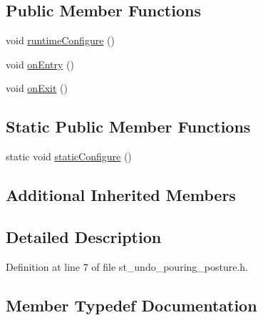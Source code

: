 \subsection*{Public Member Functions}
\begin{DoxyCompactItemize}
\item 
void \hyperlink{structsm__moveit__wine__serve_1_1StPouringUndoPosture_a43aae1e38ab92eab3f942279bf08890d}{runtime\+Configure} ()
\item 
void \hyperlink{structsm__moveit__wine__serve_1_1StPouringUndoPosture_aefad9969ee8ec5b1687faaab2b6127f8}{on\+Entry} ()
\item 
void \hyperlink{structsm__moveit__wine__serve_1_1StPouringUndoPosture_ad6034eaf66a0c5d236911bf16038dcef}{on\+Exit} ()
\end{DoxyCompactItemize}
\subsection*{Static Public Member Functions}
\begin{DoxyCompactItemize}
\item 
static void \hyperlink{structsm__moveit__wine__serve_1_1StPouringUndoPosture_a3be8e120fb67fa0108ee1741bb2e5d1e}{static\+Configure} ()
\end{DoxyCompactItemize}
\subsection*{Additional Inherited Members}


\subsection{Detailed Description}


Definition at line 7 of file st\+\_\+undo\+\_\+pouring\+\_\+posture.\+h.



\subsection{Member Typedef Documentation}
\mbox{\label{structsm__moveit__wine__serve_1_1StPouringUndoPosture_aafb240153173fa5a72cb42280e003b26}} 
